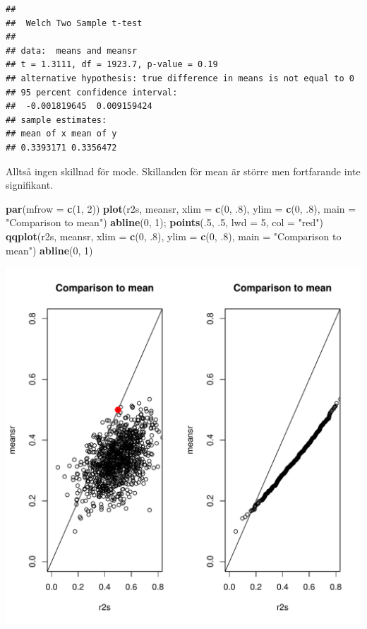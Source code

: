 \documentclass[]{article}
\newenvironment{Shaded}{\begin{snugshade}}{\end{snugshade}}
\newcommand{\KeywordTok}[1]{\textcolor[rgb]{0.13,0.29,0.53}{\textbf{{#1}}}}
\newcommand{\DataTypeTok}[1]{\textcolor[rgb]{0.13,0.29,0.53}{{#1}}}
\newcommand{\DecValTok}[1]{\textcolor[rgb]{0.00,0.00,0.81}{{#1}}}
\newcommand{\StringTok}[1]{\textcolor[rgb]{0.31,0.60,0.02}{{#1}}}
\newcommand{\NormalTok}[1]{{#1}}
\begin{document}
\begin{verbatim}
## 
##  Welch Two Sample t-test
## 
## data:  means and meansr
## t = 1.3111, df = 1923.7, p-value = 0.19
## alternative hypothesis: true difference in means is not equal to 0
## 95 percent confidence interval:
##  -0.001819645  0.009159424
## sample estimates:
## mean of x mean of y 
## 0.3393171 0.3356472
\end{verbatim}

Alltså ingen skillnad för mode. Skillanden för mean är större men
fortfarande inte signifikant.

\begin{Shaded}
\begin{Highlighting}[]
\KeywordTok{par}\NormalTok{(}\DataTypeTok{mfrow =} \KeywordTok{c}\NormalTok{(}\DecValTok{1}\NormalTok{, }\DecValTok{2}\NormalTok{))}
\KeywordTok{plot}\NormalTok{(r2s, meansr, }\DataTypeTok{xlim =} \KeywordTok{c}\NormalTok{(}\DecValTok{0}\NormalTok{, .}\DecValTok{8}\NormalTok{), }\DataTypeTok{ylim =} \KeywordTok{c}\NormalTok{(}\DecValTok{0}\NormalTok{, .}\DecValTok{8}\NormalTok{), }\DataTypeTok{main =} \StringTok{"Comparison to mean"}\NormalTok{)}
  \KeywordTok{abline}\NormalTok{(}\DecValTok{0}\NormalTok{, }\DecValTok{1}\NormalTok{); }\KeywordTok{points}\NormalTok{(.}\DecValTok{5}\NormalTok{, .}\DecValTok{5}\NormalTok{, }\DataTypeTok{lwd =} \DecValTok{5}\NormalTok{, }\DataTypeTok{col =} \StringTok{"red"}\NormalTok{)}
\KeywordTok{qqplot}\NormalTok{(r2s, meansr, }\DataTypeTok{xlim =} \KeywordTok{c}\NormalTok{(}\DecValTok{0}\NormalTok{, .}\DecValTok{8}\NormalTok{), }\DataTypeTok{ylim =} \KeywordTok{c}\NormalTok{(}\DecValTok{0}\NormalTok{, .}\DecValTok{8}\NormalTok{), }\DataTypeTok{main =} \StringTok{"Comparison to mean"}\NormalTok{)}
  \KeywordTok{abline}\NormalTok{(}\DecValTok{0}\NormalTok{, }\DecValTok{1}\NormalTok{) }
\end{Highlighting}
\end{Shaded}

\includegraphics{2016_w09_files/figure-latex/unnamed-chunk-8-1.pdf}
\end{document}

